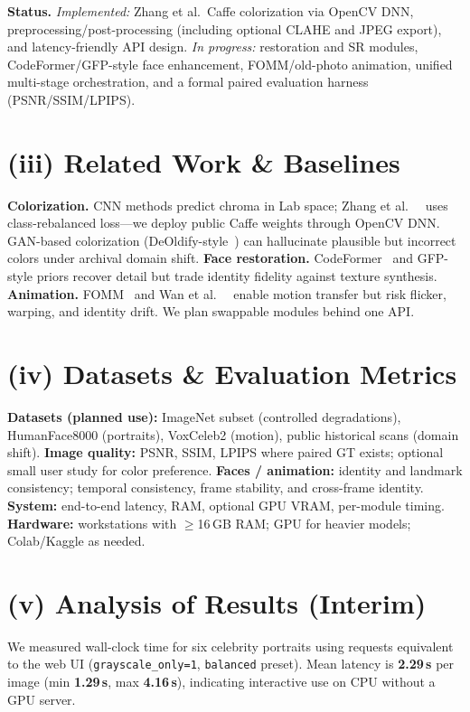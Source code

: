 \documentclass[10pt,letterpaper]{article}
\newcommand{\etal}{et al.\ }
\begin{document}
\textbf{Status.} \emph{Implemented:} Zhang \etal Caffe colorization via OpenCV DNN, preprocessing/post-processing (including optional CLAHE and JPEG export), and latency-friendly API design. \emph{In progress:} restoration and SR modules, CodeFormer/GFP-style face enhancement, FOMM/old-photo animation, unified multi-stage orchestration, and a formal paired evaluation harness (PSNR/SSIM/LPIPS).

\section{(iii) Related Work \& Baselines}
\textbf{Colorization.} CNN methods predict chroma in Lab space; Zhang \etal~\cite{zhang2016colorful} uses class-rebalanced loss---we deploy public Caffe weights through OpenCV DNN. GAN-based colorization (DeOldify-style~\cite{deoldify_review}) can hallucinate plausible but incorrect colors under archival domain shift. \textbf{Face restoration.} CodeFormer~\cite{codeformer} and GFP-style priors recover detail but trade identity fidelity against texture synthesis. \textbf{Animation.} FOMM~\cite{fomm} and Wan \etal~\cite{oldphotos} enable motion transfer but risk flicker, warping, and identity drift. We plan swappable modules behind one API.

\section{(iv) Datasets \& Evaluation Metrics}
\textbf{Datasets (planned use):} ImageNet subset (controlled degradations), HumanFace8000 (portraits), VoxCeleb2 (motion), public historical scans (domain shift). \textbf{Image quality:} PSNR, SSIM, LPIPS where paired GT exists; optional small user study for color preference. \textbf{Faces / animation:} identity and landmark consistency; temporal consistency, frame stability, and cross-frame identity. \textbf{System:} end-to-end latency, RAM, optional GPU VRAM, per-module timing. \textbf{Hardware:} workstations with $\geq$16\,GB RAM; GPU for heavier models; Colab/Kaggle as needed.

\section{(v) Analysis of Results (Interim)}
We measured wall-clock time for six celebrity portraits using requests equivalent to the web UI (\texttt{grayscale\_only=1}, \texttt{balanced} preset). Mean latency is \textbf{2.29\,s} per image (min \textbf{1.29\,s}, max \textbf{4.16\,s}), indicating interactive use on CPU without a GPU server.
\end{document}

